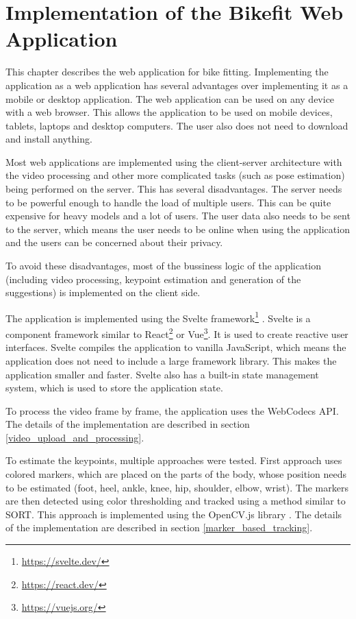 
\chapter{Implementation of the Bikefit Web Application}
\label{ch:bikefit_application}

This chapter describes the web application for bike fitting. Implementing the application as a web application has several advantages over implementing it as a mobile or desktop application. The web application can be used on any device with a web browser. This allows the application to be used on mobile devices, tablets, laptops and desktop computers. The user also does not need to download and install anything.

Most web applications are implemented using the client-server architecture with the video processing and other more complicated tasks (such as pose estimation) being performed on the server. This has several disadvantages. The server needs to be powerful enough to handle the load of multiple users. This can be quite expensive for heavy models and a lot of users. The user data also needs to be sent to the server, which means the user needs to be online when using the application and the users can be concerned about their privacy.

To avoid these disadvantages, most of the bussiness logic of the application (including video processing, keypoint estimation and generation of the suggestions) is implemented on the client side.

The application is implemented using the Svelte framework\footnote{\url{https://svelte.dev/}} . Svelte is a component framework similar to React\footnote{\url{https://react.dev/}} or Vue\footnote{\url{https://vuejs.org/}}. It is used to create reactive user interfaces. Svelte compiles the application to vanilla JavaScript, which means the application does not need to include a large framework library. This makes the application smaller and faster. Svelte also has a built-in state management system, which is used to store the application state.

To process the video frame by frame, the application uses the WebCodecs API. The details of the implementation are described in section \ref{video_upload_and_processing}.

To estimate the keypoints, multiple approaches were tested. First approach uses colored markers, which are placed on the parts of the body, whose position needs to be estimated (foot, heel, ankle, knee, hip, shoulder, elbow, wrist). The markers are then detected using color thresholding and tracked using a method similar to SORT. This approach is implemented using the OpenCV.js library \cite{opencvjs}. The details of the implementation are described in section \ref{marker_based_tracking}.

